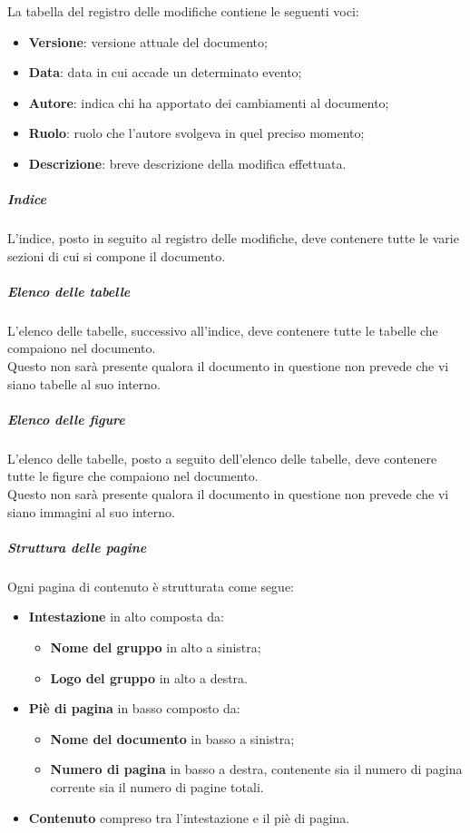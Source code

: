 La tabella del registro delle modifiche contiene le seguenti voci:
\begin{itemize}
    \item \textbf{Versione}: versione attuale del documento;
    \item \textbf{Data}: data in cui accade un determinato evento;
    \item \textbf{Autore}: indica chi ha apportato dei cambiamenti al documento;
    \item \textbf{Ruolo}: ruolo che l'autore svolgeva in quel preciso momento;
    \item \textbf{Descrizione}: breve descrizione della modifica effettuata.
          \end {itemize}
          \subparagraph{Indice}
          L'indice, posto in seguito al registro delle modifiche, deve contenere tutte le varie sezioni di cui si compone il documento.
          \subparagraph{Elenco delle tabelle}
          L'elenco delle tabelle, successivo all'indice, deve contenere tutte le tabelle che compaiono nel documento.\\
          Questo non sarà presente qualora il documento in questione non prevede che vi siano tabelle al suo interno.
          \subparagraph{Elenco delle figure}
          L'elenco delle tabelle, posto a seguito dell'elenco delle tabelle, deve contenere tutte le figure che compaiono nel documento.\\
          Questo non sarà presente qualora il documento in questione non prevede che vi siano immagini al suo interno.

          \subparagraph{Struttura delle pagine}
          Ogni pagina di contenuto è strutturata come segue:
          \begin {itemize}
    \item \textbf{Intestazione} in alto composta da:
          \begin {itemize}
    \item \textbf{Nome del gruppo} in alto a sinistra;
    \item \textbf{Logo del gruppo} in alto a destra.
\end{itemize}
\item \textbf{Piè di pagina} in basso composto da:
\begin{itemize}
\item \textbf{Nome del documento} in basso a sinistra;
\item \textbf{Numero di pagina} in basso a destra, contenente sia il numero di pagina corrente sia il numero di pagine totali.
\end {itemize}
\item \textbf{Contenuto} compreso tra l'intestazione e il piè di pagina.
\end {itemize}

